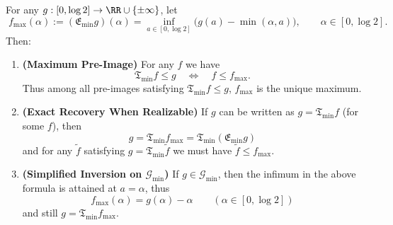 \begin{theorem}\label{thm:pom-min-kernel-projection-and-inversion}
For any \(g:[0,\log 2]\to\RR\cup\{\pm\infty\}\), let
\begin{equation}\label{eq:pom-min-kernel-inversion-f-from-g}
\boxed{\;
f_{\max}(\alpha):=(\mathfrak{E}_{\min}g)(\alpha)
=\inf_{a\in[0,\log 2]}\bigl(g(a)-\min(\alpha,a)\bigr),\qquad \alpha\in[0,\log 2].\;}
\end{equation}
Then:
\begin{enumerate}
  \item \textbf{(Maximum Pre-Image)} For any \(f\) we have
  \[
  \mathfrak{T}_{\min}f\le g\quad\Longleftrightarrow\quad f\le f_{\max}.
  \]
  Thus among all pre-images satisfying \(\mathfrak{T}_{\min}f\le g\), \(f_{\max}\) is the unique maximum.
  \item \textbf{(Exact Recovery When Realizable)} If \(g\) can be written as \(g=\mathfrak{T}_{\min}f\) (for some \(f\)), then
  \[
  \boxed{\;
  g=\mathfrak{T}_{\min}f_{\max}=\mathfrak{T}_{\min}(\mathfrak{E}_{\min}g)\;}
  \]
  and for any \(\tilde f\) satisfying \(g=\mathfrak{T}_{\min}\tilde f\) we must have \(\tilde f\le f_{\max}\).
  \item \textbf{(Simplified Inversion on \(\mathcal{G}_{\min}\))} If \(g\in\mathcal{G}_{\min}\), then the infimum in the above formula is attained at \(a=\alpha\), thus
  \[
  \boxed{\;
  f_{\max}(\alpha)=g(\alpha)-\alpha\qquad(\alpha\in[0,\log 2])\;}
  \]
  and still \(g=\mathfrak{T}_{\min}f_{\max}\).
\end{enumerate}
\end{theorem}
